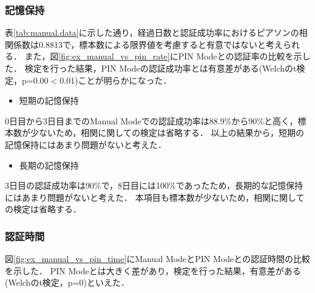 \subsubsection{記憶保持}
表\ref{tab:manual.data}に示した通り，経過日数と認証成功率におけるピアソンの相関係数は0.8813で，標本数による限界値\cite{978-4641121607}を考慮すると有意ではないと考えられる．
また，図\ref{fig:ex_manual_vs_pin_rate}にPIN Modeとの認証率の比較を示した．
検定を行った結果，PIN Modeの認証成功率とは有意差がある(Welchのt検定，p=0.00$<$0.01)ことが明らかになった．
\begin{itemize}
  \item 短期の記憶保持
\end{itemize}
0日目から3日目までのManual Modeでの認証成功率は88.9\%から90\%と高く，標本数が少ないため，相関に関しての検定は省略する．
以上の結果から，短期の記憶保持にはあまり問題がないと考えた．

\begin{itemize}
  \item 長期の記憶保持
\end{itemize}
3日目の認証成功率は90\%で，8日目には100\%であったため，長期的な記憶保持にはあまり問題がないと考えた．
本項目も標本数が少ないため，相関に関しての検定は省略する．

\subsubsection{認証時間}
図\ref{fig:ex_manual_vs_pin_time}にManual ModeとPIN Modeとの認証時間の比較を示した．
PIN Modeとは大きく差があり，検定を行った結果，有意差がある(Welchのt検定，p=0)といえた．


